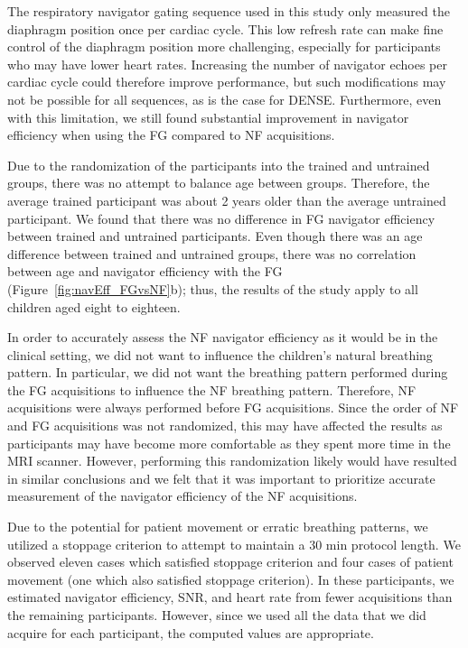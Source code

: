 		The respiratory navigator gating sequence used in this study only measured the diaphragm position once per cardiac cycle. This low refresh rate can make fine control of the diaphragm position more challenging, especially for participants who may have lower heart rates. Increasing the number of navigator echoes per cardiac cycle could therefore improve performance, but such modifications may not be possible for all sequences, as is the case for DENSE. Furthermore, even with this limitation, we still found substantial improvement in navigator efficiency when using the FG compared to NF acquisitions.
		
		Due to the randomization of the participants into the trained and untrained groups, there was no attempt to balance age between groups. Therefore, the average trained participant was about 2 years older than the average untrained participant. We found that there was no difference in FG navigator efficiency between trained and untrained participants. Even though there was an age difference between trained and untrained groups, there was no correlation between age and navigator efficiency with the FG (Figure~\ref{fig:navEff_FGvsNF}b); thus, the results of the study apply to all children aged eight to eighteen.
		
		In order to accurately assess the NF navigator efficiency as it would be in the clinical setting, we did not want to influence the children's natural breathing pattern. In particular, we did not want the breathing pattern performed during the FG acquisitions to influence the NF breathing pattern. Therefore, NF acquisitions were always performed before FG acquisitions. Since the order of NF and FG acquisitions was not randomized, this may have affected the results as participants may have become more comfortable as they spent more time in the MRI scanner. However, performing this randomization likely would have resulted in similar conclusions and we felt that it was important to prioritize accurate measurement of the navigator efficiency of the NF acquisitions.
		
		Due to the potential for patient movement or erratic breathing patterns, we utilized a stoppage criterion to attempt to maintain a 30 min protocol length. We observed eleven cases which satisfied stoppage criterion and four cases of patient movement (one which also satisfied stoppage criterion). In these participants, we estimated navigator efficiency, SNR, and heart rate from fewer acquisitions than the remaining participants. However, since we used all the data that we did acquire for each participant, the computed values are appropriate.
		
